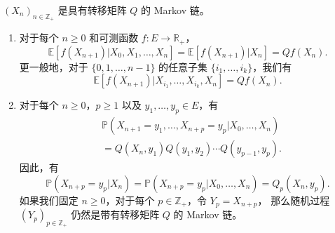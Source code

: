 \documentclass[fontset=none]{Notes}
\begin{document}
\begin{proposition}
  $(X_n)_{n\in \mathbb{Z}_+}$ 是具有转移矩阵 $Q$ 的 Markov 链。
  \begin{enumerate}
    \item 对于每个 $n\geq 0$ 和可测函数 $f:E\to \mathbb{R}_+$，
    \[
      \mathbb{E}[f(X_{n+1})|X_0,X_1,\dots,X_n]=\mathbb{E}[f(X_{n+1})|X_n]=Qf(X_n).
    \]
    更一般地，对于 $\{0,1,\dots,n-1\}$ 的任意子集 $\{i_1,\dots,i_k\}$，我们有
    \[
      \mathbb{E}[f(X_{n+1})|X_{i_1},\dots,X_{i_k},X_n]=Qf(X_n).
    \]
    \item 对于每个 $n\geq 0$，$p\geq 1$ 以及 $y_1,\dots,y_p\in E$，有
    \begin{align*}
      &\mathbb{P}(X_{n+1}=y_1,\dots,X_{n+p}=y_p|X_0,\dots,X_n)\\
      &=Q(X_n,y_1)Q(y_1,y_2)\cdots Q(y_{p-1},y_p).
    \end{align*}
    因此，有
    \[
      \mathbb{P}(X_{n+p}=y_p|X_n)=\mathbb{P}(X_{n+p}=y_p|X_0,\dots,X_n)=
      Q_p(X_n,y_p).
    \]
    如果我们固定 $n\geq 0$，对于每个 $p\in \mathbb{Z}_+$，令 $Y_p=X_{n+p}$，
    那么随机过程 $(Y_p)_{p\in \mathbb{Z}_+}$ 仍然是带有转移矩阵 $Q$ 的 Markov 链。
  \end{enumerate}
\end{proposition}
\end{document}
